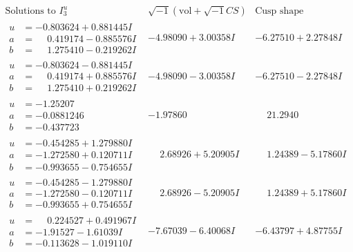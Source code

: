 \documentclass[1p]{elsarticle_modified}
\theoremstyle{definition}
\newcommand{\I}{\sqrt{-1}}
\begin{document}
$$\begin{array}{c|c|c}  
\text{Solutions to }I^u_{3}& \I (\text{vol} + \sqrt{-1}CS) & \text{Cusp shape}\\
 \hline 
\begin{aligned}
u &= -0.803624 + 0.881445 I \\
a &= \phantom{-}0.419174 - 0.885576 I \\
b &= \phantom{-}1.275410 - 0.219262 I\end{aligned}
 & -4.98090 + 3.00358 I & -6.27510 + 2.27848 I \\ \hline\begin{aligned}
u &= -0.803624 - 0.881445 I \\
a &= \phantom{-}0.419174 + 0.885576 I \\
b &= \phantom{-}1.275410 + 0.219262 I\end{aligned}
 & -4.98090 - 3.00358 I & -6.27510 - 2.27848 I \\ \hline\begin{aligned}
u &= -1.25207\phantom{ +0.000000I} \\
a &= -0.0881246\phantom{ +0.000000I} \\
b &= -0.437723\phantom{ +0.000000I}\end{aligned}
 & -1.97860\phantom{ +0.000000I} & \phantom{-}21.2940\phantom{ +0.000000I} \\ \hline\begin{aligned}
u &= -0.454285 + 1.279880 I \\
a &= -1.272580 + 0.120711 I \\
b &= -0.993655 - 0.754655 I\end{aligned}
 & \phantom{-}2.68926 + 5.20905 I & \phantom{-}1.24389 - 5.17860 I \\ \hline\begin{aligned}
u &= -0.454285 - 1.279880 I \\
a &= -1.272580 - 0.120711 I \\
b &= -0.993655 + 0.754655 I\end{aligned}
 & \phantom{-}2.68926 - 5.20905 I & \phantom{-}1.24389 + 5.17860 I \\ \hline\begin{aligned}
u &= \phantom{-}0.224527 + 0.491967 I \\
a &= -1.91527 - 1.61039 I \\
b &= -0.113628 - 1.019110 I\end{aligned}
 & -7.67039 - 6.40068 I & -6.43797 + 4.87755 I \\ \hline\begin{aligned}

\end{aligned}
\end{array}$$
\end{document}
